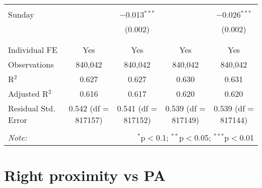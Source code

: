 \documentclass[
]{article}
\begin{document}
\begin{table}[!htbp]
{\begin{tabular}{@{\extracolsep{5pt}}lcccc}
  & & & & \\ 
 Sunday &  & $-$0.013$^{***}$ &  & $-$0.026$^{***}$ \\ 
  &  & (0.002) &  & (0.002) \\ 
  & & & & \\ 
\hline \\[-1.8ex] 
Individual FE & Yes & Yes & Yes & Yes \\ 
Observations & 840,042 & 840,042 & 840,042 & 840,042 \\ 
R$^{2}$ & 0.627 & 0.627 & 0.630 & 0.631 \\ 
Adjusted R$^{2}$ & 0.616 & 0.617 & 0.620 & 0.620 \\ 
Residual Std. Error & 0.542 (df = 817157) & 0.541 (df = 817152) & 0.539 (df = 817149) & 0.539 (df = 817144) \\ 
\hline 
\hline \\[-1.8ex] 
\textit{Note:}  & \multicolumn{4}{r}{$^{*}$p$<$0.1; $^{**}$p$<$0.05; $^{***}$p$<$0.01} \\ 
\end{tabular}
} 
\end{table} 
\newpage
\section{Right proximity vs PA}
\end{document}

